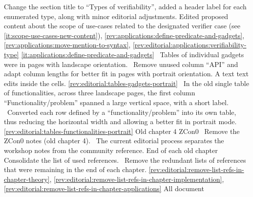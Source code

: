 				Change the section title to ``Types of verifiability'', added a header label for each enumerated type, along with minor editorial adjustments.
				Edited proposed content about the scope of use-cases related to the designated verifier case (see \ref{it:scope-use-cases-new-content}),
\newcol \ref{rev:applications:define-predicate-and-gadgets}, \ref{rev:applications:move-mention-to-syntax}, \ref{rev:editorial:applications:verifiability-type}
\rowendL
\newcol 
\newcol \ref{it:applications:define-predicate-and-gadgets}
\newcol \Note\ Tables of individual gadgets were in pages with landscape orientation.
				\Chan\ Remove unused column ``API'' and adapt column lengths for better fit in pages with portrait orientation. A text text edits inside the cells.
\newcol \ref{rev:editorial:tables-gadgets-portrait}
\rowendL
\newcol 
\newcol 
\newcol \Note\ In the old single table of functionalities, across three landscape pages, the first column ``Functionality/problem'' spanned a large vertical space, with a short label.
				\Chan\ Converted each row defined by a ``functionality/problem'' into its own table, thus reducing the horizontal width and allowing a better fit in portrait mode.
\newcol \ref{rev:editorial:tables-functionalities-portrait}
\rowendL
Old chapter 4 ZCon0
\newcol 
\newcol {}
\newcol \Chan\ Remove the ZCon0 notes (old chapter 4). \Note\ The current editorial process separates the workshop notes from the community reference.
\newcol 
\rowendL
End of each old chapter
\newcol 
\newcol Consolidate the list of used references.
\newcol \Chan\ Remove the redundant lists of references that were remaining in the end of each chapter.
\newcol \ref{rev:editorial:remove-list-refs-in-chapter-theory}, \ref{rev:editorial:remove-list-refs-in-chapter-implementation}, \ref{rev:editorial:remove-list-refs-in-chapter-applications}
\rowendL
All document
\newcol 
\newcol {}
\newcol \Chan\ 
\newcol 
\rowendL
\myendIssue
